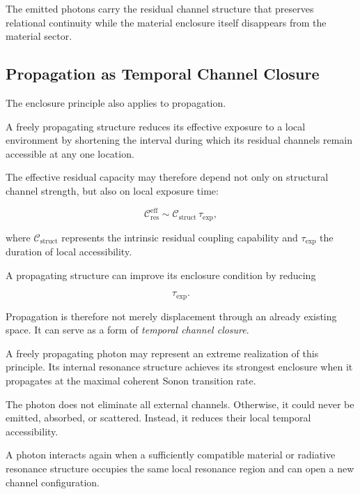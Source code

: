 \documentclass[11pt,a4paper]{article}
\begin{document}
The emitted photons carry the residual channel structure that preserves relational continuity while the material enclosure itself disappears from the material sector.




\subsection{Propagation as Temporal Channel Closure}
\label{sec:propagation_temporal_closure}

The enclosure principle also applies to propagation.

A freely propagating structure reduces its effective exposure to a local environment by shortening the interval during which its residual channels remain accessible at any one location.

The effective residual capacity may therefore depend not only on structural channel strength, but also on local exposure time:

\begin{equation}
    \mathcal{C}_{\mathrm{res}}^{\mathrm{eff}}
    \sim
    \mathcal{C}_{\mathrm{struct}}
    \,
    \tau_{\mathrm{exp}},
    \label{eq:effective_residual_capacity}
\end{equation}

where $\mathcal{C}_{\mathrm{struct}}$ represents the intrinsic residual coupling capability and $\tau_{\mathrm{exp}}$ the duration of local accessibility.

A propagating structure can improve its enclosure condition by reducing

\begin{equation}
    \tau_{\mathrm{exp}}.
\end{equation}

Propagation is therefore not merely displacement through an already existing space. It can serve as a form of \emph{temporal channel closure}.

A freely propagating photon may represent an extreme realization of this principle. Its internal resonance structure achieves its strongest enclosure when it propagates at the maximal coherent Sonon transition rate.

The photon does not eliminate all external channels. Otherwise, it could never be emitted, absorbed, or scattered. Instead, it reduces their local temporal accessibility.

A photon interacts again when a sufficiently compatible material or radiative resonance structure occupies the same local resonance region and can open a new channel configuration.
\end{document}
